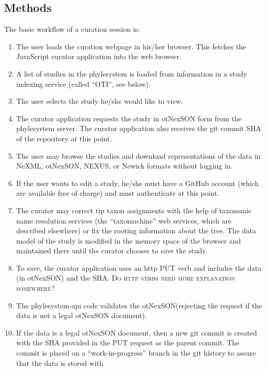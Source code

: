 \documentclass{bioinfo}
\newcommand{\ps}{phylesystem\xspace}
\newcommand{\nexson}{otNexSON\xspace}
\newcommand{\js}{JavaScript\xspace}
\newcommand{\ejmcomment}[1]{{\color{green} \textsc{#1}}\xspace}
\begin{document}
\begin{methods}
\section{Methods}
The basic workflow of a curation session is:
\begin{enumerate}
    \item \label{loadAppStep} The user loads the curation webpage in his/her browser.  This fetches the \js curator application into the web browser.
    \item \label{otiListStep} A list of studies in the \ps is loaded from information in a study indexing service (called ``OTI'', see below).
    \item The user selects the study he/she would like to view.
    \item \label{getStudyStep} The curator application requests the study in \nexson form from the \ps server.
        The curator application also receives the git commit SHA of the 
        repository at this point.
    \item \label{browseStep} The user may browse the studies and download representations of the data in NeXML, \nexson, NEXUS\cite{NEXUS}, or Newick formats without logging in.
    \item \label{authStep} If the user wants to edit a study, he/she must have a GitHub account (which are available free of charge) and must authenticate at this point.
    \item \label{userEditStep} The curator may correct tip taxon assignments with the help of taxonomic name resolution services (the ``taxomachine'' web services, which are described
        elsewhere) or fix the rooting information about the tree. The data model of the study is modified in the memory space of the 
        browser and maintained there until the curator chooses to save the study.
    \item \label{putStep} To save, the curator application uses an http PUT verb and includes the data (in \nexson) and the SHA. \ejmcomment{Do http verbs need more explanation somewhere?}
    \item \label{validateStep} The \ps-api code validates the \nexson (rejecting the request if the data is not a legal \nexson document).
    \item \label{gitSaveStep} If the data is a legal \nexson document, then a new git commit is created with the SHA
        provided in the PUT request as the parent commit. The commit is placed on a 
        ``work-in-progress'' branch in the git history to assure that the data is stored with 

\end{enumerate}
\end{methods}
\end{document}
